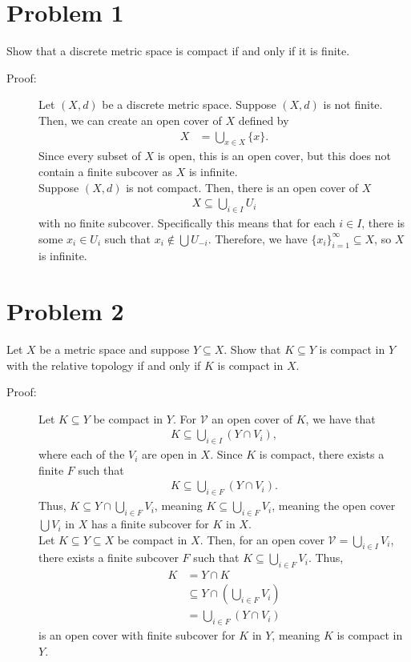 \documentclass[10pt]{extarticle}
\title{}
\author{}
\date{}
\begin{document}
  \section{Problem 1}%
  Show that a discrete metric space is compact if and only if it is finite.
  \begin{description}
    \item[Proof:] Let $(X,d)$ be a discrete metric space. Suppose $(X,d)$ is not finite. Then, we can create an open cover of $X$ defined by
      \begin{align*}
        X &= \bigcup_{x\in X}\{x\}.
      \end{align*}
      Since every subset of $X$ is open, this is an open cover, but this does not contain a finite subcover as $X$ is infinite.\\

      Suppose $(X,d)$ is not compact. Then, there is an open cover of $X$
      \begin{align*}
        X \subseteq \bigcup_{i\in I} U_i
      \end{align*}
      with no finite subcover. Specifically this means that for each $i\in I$, there is some $x_{i}\in U_i$ such that $x_{i}\notin \bigcup U_{-i}$. Therefore, we have $\{x_i\}_{i=1}^{\infty}\subseteq X$, so $X$ is infinite.
  \end{description}
  \section{Problem 2}%
  Let $X$ be a metric space and suppose $Y\subseteq X$. Show that $K\subseteq Y$ is compact in $Y$ with the relative topology if and only if $K$ is compact in $X$.
  \begin{description}
    \item[Proof:] Let $K\subseteq Y$ be compact in $Y$. For $\mathcal{V}$ an open cover of $K$, we have that
      \begin{align*}
        K\subseteq \bigcup_{i\in I}(Y\cap V_i),
      \end{align*}
      where each of the $V_i$ are open in $X$. Since $K$ is compact, there exists a finite $F$ such that
      \begin{align*}
        K\subseteq \bigcup_{i\in F}(Y\cap V_i).
      \end{align*}
      Thus, $K\subseteq Y\cap \bigcup_{i\in F}V_i$, meaning $K\subseteq \bigcup_{i\in F}V_i$, meaning the open cover $\bigcup V_i$ in $X$ has a finite subcover for $K$ in $X$.\\

      Let $K\subseteq Y\subseteq X$ be compact in $X$. Then, for an open cover $\mathcal{V} = \bigcup_{i\in I}V_i$, there exists a finite subcover $F$ such that $K\subseteq \bigcup_{i\in F}V_i$. Thus,
      \begin{align*}
        K &= Y\cap K\\
          &\subseteq Y\cap \left(\bigcup_{i\in F}V_i\right)\\
          &= \bigcup_{i\in F}(Y\cap V_i)
      \end{align*}
      is an open cover with finite subcover for $K$ in $Y$, meaning $K$ is compact in $Y$.
  \end{description}
\end{document}
